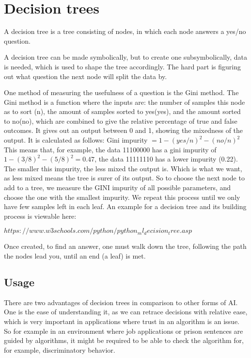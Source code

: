 \section{Decision trees}
\label{sec:decisionTrees}
A decision tree is a tree consisting of nodes, in which each node answers a yes/no question. 

A decision tree can be made symbolically, but to create one subsymbolically, data is needed, which is used to shape the tree accordingly.
The hard part is figuring out what question the next node will split the data by. 

One method of measuring the usefulness of a question is the Gini method.
The Gini method is a function where the inputs are: the number of samples this node as to sort (n), the amount of samples sorted to yes(yes), and the amount sorted to no(no), which are combined to give the relative percentage of true and false outcomes. It gives out an output between 0 and 1, showing the mixedness of the output.
It is calculated as follows: Gini impurity $= 1-(yes/n)^2-(no/n)^2$ 
This means that, for example, the data 11100000 has a gini impurity of $1-(3/8)^2-(5/8)^2=0.47$, the data 11111110 has a lower impurity (0.22).
The smaller this impurity, the less mixed the output is. Which is what we want, as less mixed means the tree is surer of its output. 
So to choose the next node to add to a tree, we measure the GINI impurity of all possible parameters, and choose the one with the smallest impurity. We repeat this process until we only have few samples left in each leaf. 
An example for a decision tree and its building process is viewable here:

$https://www.w3schools.com/python/python_ml_decision_tree.asp$

Once created, to find an answer, one must walk down the tree, following the path the nodes lead you, until an end (a leaf) is met.

\subsection{Usage}
There are two advantages of decision trees in comparison to other forms of AI. One is the ease of understanding it, as we can retrace decisions with relative ease, which is very important in applications where trust in an algorithm is an issue. So for example in an environment where job applications or prison sentences are guided by algorithms, it might be required to be able to check the algorithm for, for example, discriminatory behavior.

